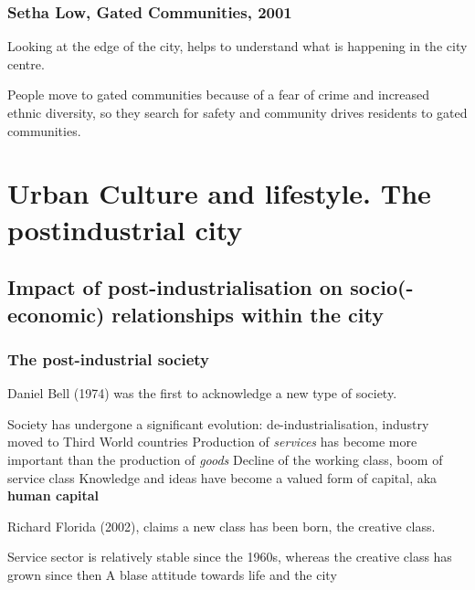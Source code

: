 \documentclass{article}
\begin{document}
\subsubsection{Setha Low, Gated Communities, 2001}

Looking at the edge of the city, helps to understand what is happening in the city centre.

People move to gated communities because of a fear of crime and increased ethnic diversity, so they search for safety and community drives residents to gated communities.



\section{Urban Culture and lifestyle. The postindustrial city}
\date{September 28th, 2021}

\subsection{Impact of post-industrialisation on socio(-economic) relationships within the city}

\subsubsection{The post-industrial society}

Daniel Bell (1974) was the first to acknowledge a new type of society. 

\begin{outline}
	\1 Society has undergone a significant evolution: de-industrialisation, industry moved to Third World countries
	\1 Production of \textit{services} has become more important than the production of \textit{goods}
		\2 Decline of the working class, boom of service class
	\1 Knowledge and ideas have become a valued form of capital, aka \textbf{human capital}
\end{outline}

Richard Florida (2002), claims a new class has been born, the creative class.

\begin{outline}
	\1 Service sector is relatively stable since the 1960s, whereas the creative class has grown since then
	\1 A blase attitude towards life and the city
\end{outline}
\end{document}
